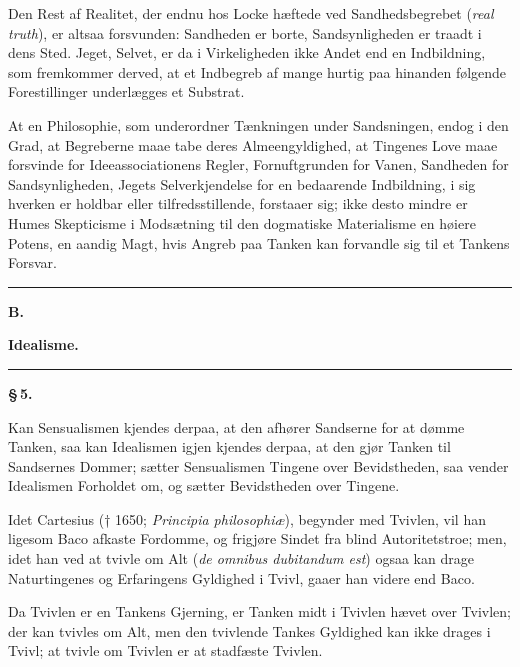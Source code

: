 \documentclass[12pt]{book}
\newcommand{\opage}[1]{\marginnote{\footnotesize\textit{[#1]}}}
\begin{document}
Den Rest af Realitet, der endnu hos Locke hæftede ved Sandhedsbegrebet
(\textit{real truth}), er altsaa forsvunden: Sandheden er borte, Sandsynligheden er
traadt i dens Sted. Jeget, Selvet, er da i Virkeligheden ikke Andet end en
Indbildning, som fremkommer derved, at et Indbegreb af mange hurtig paa hinanden
følgende Forestillinger underlægges et Substrat.

At en Philosophie, som underordner Tænkningen under Sandsningen, endog i den Grad,
at Begreberne maae tabe deres Almeengyldighed, at Tingenes Love maae forsvinde for
Ideeassociationens Regler, Fornuftgrunden for Vanen, Sandheden for Sandsynligheden,
Jegets Selverkjendelse for en bedaarende Indbildning, i sig hverken er holdbar eller
tilfredsstillende, forstaaer sig; ikke desto mindre er Humes Skepticisme i
Modsætning til den dogmatiske Materialisme en høiere Potens, en aandig Magt, hvis
Angreb paa Tanken kan forvandle sig til et Tankens Forsvar.

\begin{center}\rule{2.5cm}{0.4pt}\end{center}
\opage{18} \begin{center}
  {\large\bfseries B.}\par\vspace{2pt}
  {\bfseries Idealisme.}\par\vspace{4pt}
  \rule{2cm}{0.4pt}
\end{center}
{}

\begin{center}{\bfseries \S\,5.}\end{center}

\noindent Kan Sensualismen kjendes derpaa, at den afhører Sandserne for at dømme
Tanken, saa kan Idealismen igjen kjendes derpaa, at den gjør Tanken til Sandsernes
Dommer; sætter Sensualismen Tingene over Bevidstheden, saa vender Idealismen
Forholdet om, og sætter Bevidstheden over Tingene.

Idet Cartesius († 1650; \textit{Principia philosophiæ}), begynder med Tvivlen, vil
han ligesom Baco afkaste Fordomme, og frigjøre Sindet fra blind Autoritetstroe;
men, idet han ved at tvivle om Alt (\textit{de omnibus dubitandum est}) ogsaa kan
drage Naturtingenes og Erfaringens Gyldighed i Tvivl, gaaer han videre end Baco.

Da Tvivlen er en Tankens Gjerning, er Tanken midt i Tvivlen hævet over Tvivlen; der
kan tvivles om Alt, men den tvivlende Tankes Gyldighed kan ikke drages i Tvivl; at
tvivle om Tvivlen er at stadfæste Tvivlen.
\end{document}
